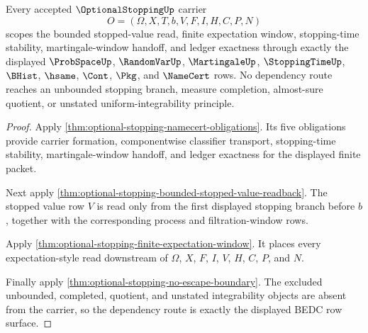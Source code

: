 \begin{theorem}
\label{thm:optional-stopping-scoped-dependency-route}
Every accepted $\OptionalStoppingUp$ carrier
$$
O=(\Omega,X,T,b,V,F,I,H,C,P,N)
$$
scopes the bounded stopped-value read, finite expectation window, stopping-time stability, martingale-window handoff, and ledger exactness through exactly the displayed $\ProbSpaceUp$, $\RandomVarUp$, $\MartingaleUp$, $\StoppingTimeUp$, $\BHist$, $\hsame$, $\Cont$, $\Pkg$, and $\NameCert$ rows. No dependency route reaches an unbounded stopping branch, measure completion, almost-sure quotient, or unstated uniform-integrability principle.
\end{theorem}
\begin{proof}
Apply \autoref{thm:optional-stopping-namecert-obligations}. Its five obligations provide carrier formation, componentwise classifier transport, stopping-time stability, martingale-window handoff, and ledger exactness for the displayed finite packet.

Next apply \autoref{thm:optional-stopping-bounded-stopped-value-readback}. The stopped value row $V$ is read only from the first displayed stopping branch before $b$, together with the corresponding process and filtration-window rows.

Apply \autoref{thm:optional-stopping-finite-expectation-window}. It places every expectation-style read downstream of $\Omega$, $X$, $F$, $I$, $V$, $H$, $C$, $P$, and $N$.

Finally apply \autoref{thm:optional-stopping-no-escape-boundary}. The excluded unbounded, completed, quotient, and unstated integrability objects are absent from the carrier, so the dependency route is exactly the displayed BEDC row surface.
\end{proof}


